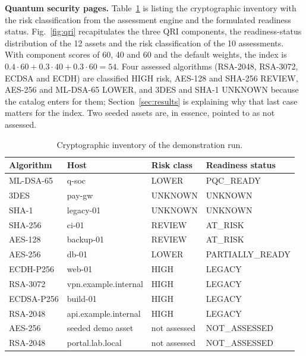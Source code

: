 \documentclass[conference]{IEEEtran}
\begin{document}
\textbf{Quantum security pages.} Table~\ref{tab:demoinv} is listing the cryptographic inventory with the risk classification from the assessment engine and the formulated readiness status. Fig.~\ref{fig:qri} recapitulates the three QRI components, the readiness-status distribution of the 12 assets and the risk classification of the 10 assessments. With component scores of 60, 40 and 60 and the default weights, the index is $0.4\cdot 60 + 0.3\cdot 40 + 0.3\cdot 60 = 54$. Four assessed algorithms (RSA-2048, RSA-3072, ECDSA and ECDH) are classified HIGH risk, AES-128 and SHA-256 REVIEW, AES-256 and ML-DSA-65 LOWER, and 3DES and SHA-1 UNKNOWN because the catalog enters for them; Section~\ref{sec:results} is explaining why that last case matters for the index. Two seeded assets are, in essence, pointed to as not assessed.

\begin{table}[t]
\caption{Cryptographic inventory of the demonstration run.}
\label{tab:demoinv}
\centering
\footnotesize
\setlength{\tabcolsep}{3pt}
\begin{tabular}{@{}l l l l@{}}
\toprule
Algorithm & Host & Risk class & Readiness status \\
\midrule
ML-DSA-65 & q-soc & LOWER & PQC\_READY \\
3DES & pay-gw & UNKNOWN & UNKNOWN \\
SHA-1 & legacy-01 & UNKNOWN & UNKNOWN \\
SHA-256 & ci-01 & REVIEW & AT\_RISK \\
AES-128 & backup-01 & REVIEW & AT\_RISK \\
AES-256 & db-01 & LOWER & PARTIALLY\_READY \\
ECDH-P256 & web-01 & HIGH & LEGACY \\
RSA-3072 & vpn.example.internal & HIGH & LEGACY \\
ECDSA-P256 & build-01 & HIGH & LEGACY \\
RSA-2048 & api.example.internal & HIGH & LEGACY \\
AES-256 & seeded demo asset & not assessed & NOT\_ASSESSED \\
RSA-2048 & portal.lab.local & not assessed & NOT\_ASSESSED \\
\bottomrule
\end{tabular}
\end{table}
\end{document}
